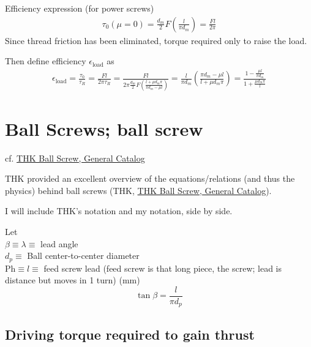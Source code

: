 \documentclass[10pt]{amsart}
\begin{document}
\begin{multicols*}{2}
Efficiency expression (for power screws)
\begin{equation}
\begin{gathered}
	\tau_0(\mu = 0)  = \frac{d_m}{2} F\left( \frac{l }{ \pi d_m} \right)  = \frac{Fl}{2\pi }
\end{gathered}
\end{equation}
Since thread friction has been eliminated, torque required only to raise the load.  

Then define efficiency $\epsilon_{\text{load}}$ as 
\begin{equation}
\begin{gathered}
	\epsilon_{\text{load}} = \frac{ \tau_0 }{ \tau_R} = \frac{Fl}{2\pi \tau_R} = \frac{Fl}{ 2\pi  \frac{d_m}{2} F \left( \frac{ l + \mu d_m \pi }{ \pi d_m - \mu l } \right) } = \frac{l}{ \pi d_m} \left( \frac{ \pi d_m - \mu l }{ l + \mu d_m \pi } \right) = \frac{1 - \frac{ \mu l }{ \pi d_m } }{ 1 + \frac{ \mu d_m \pi }{ l }  } 
\end{gathered}
\end{equation}


\section{Ball Screws; ball screw} 

cf. \href{https://www.thk.com/sites/default/files/documents/uk_pdf/product/general/a/ee_A15.pdf}{THK Ball Screw, General Catalog}

THK provided an excellent overview of the equations/relations (and thus the physics) behind ball screws (THK, \href{https://www.thk.com/sites/default/files/documents/uk_pdf/product/general/a/ee_A15.pdf}{THK Ball Screw, General Catalog}).  

I will include THK's notation and my notation, side by side.  

Let \\
$\beta \equiv \lambda \equiv$ lead angle  \\
$d_p \equiv $ Ball center-to-center diameter \\
$\text{Ph} \equiv l \equiv $ feed screw lead (feed screw is that long piece, the screw; lead is distance but moves in 1 turn) (mm) \\
\begin{equation}
	\tan{\beta} = \frac{l}{\pi d_p} 
\end{equation}

\subsection{Driving torque required to gain thrust} 


\end{multicols*}
\end{document}

